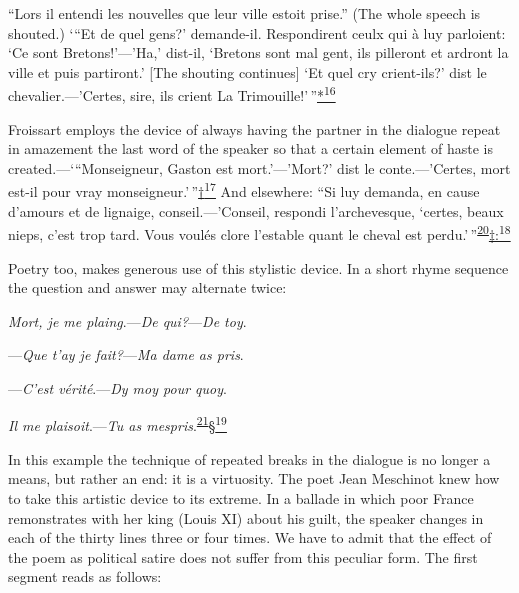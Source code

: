 ``Lors il entendi les nouvelles que leur ville estoit prise.'' (The
whole speech is shouted.) `{}``Et de quel gens?' demande-il.
Respondirent ceulx qui à luy parloient: `Ce sont Bretons!'---'Ha,'
\protect\hypertarget{21_Chapter_Thirteen__IMAGE_AND_WORD.xhtmlux5cux23page_348}{}{}dist-il,
`Bretons sont mal gent, ils pilleront et ardront la ville et puis
partiront.' {[}The shouting continues{]} `Et quel cry crient-ils?' dist
le chevalier.---'Certes, sire, ils crient La
Trimouille!'\,''\protect\hypertarget{21_Chapter_Thirteen__IMAGE_AND_WORD.xhtmlux5cux23id_2725}{\protect\hyperlink{23_NOTES.xhtmlux5cux23id_2726}{*\textsuperscript{16}}}

Froissart employs the device of always having the partner in the
dialogue repeat in amazement the last word of the speaker so that a
certain element of haste is created.---`{}``Monseigneur, Gaston est
mort.'---'Mort?' dist le conte.---'Certes, mort est-il pour vray
monseigneur.'\,''\protect\hypertarget{21_Chapter_Thirteen__IMAGE_AND_WORD.xhtmlux5cux23id_2727}{\protect\hyperlink{23_NOTES.xhtmlux5cux23id_2728}{†\textsuperscript{17}}}
And elsewhere: ``Si luy demanda, en cause d'amours et de lignaige,
conseil.---'Conseil, respondi l'archevesque, `certes, beaux nieps, c'est
trop tard. Vous voulés clore l'estable quant le cheval est
perdu.'\,''\textsuperscript{\protect\hypertarget{21_Chapter_Thirteen__IMAGE_AND_WORD.xhtmlux5cux23id_270}{\protect\hyperlink{23_NOTES.xhtmlux5cux23id_271}{20}}}\protect\hypertarget{21_Chapter_Thirteen__IMAGE_AND_WORD.xhtmlux5cux23id_2729}{\protect\hyperlink{23_NOTES.xhtmlux5cux23id_2730}{‡:\textsuperscript{18}}}

Poetry too, makes generous use of this stylistic device. In a short
rhyme sequence the question and answer may alternate twice:

\emph{Mort, je me plaing}.---\emph{De qui?}---\emph{De toy}.

---\emph{Que t'ay je fait?}---\emph{Ma dame as pris}.

---\emph{C'est vérité}.---\emph{Dy moy pour quoy}.

\emph{Il me plaisoit}.---\emph{Tu as
mespris}.\textsuperscript{\protect\hypertarget{21_Chapter_Thirteen__IMAGE_AND_WORD.xhtmlux5cux23id_268}{\protect\hyperlink{23_NOTES.xhtmlux5cux23id_269}{21}}}\protect\hypertarget{21_Chapter_Thirteen__IMAGE_AND_WORD.xhtmlux5cux23id_2731}{\protect\hyperlink{23_NOTES.xhtmlux5cux23id_2732}{§\textsuperscript{19}}}

In this example the technique of repeated breaks in the dialogue is no
longer a means, but rather an end: it is a virtuosity. The poet Jean
Meschinot knew how to take this artistic device to its extreme. In a
ballade in which poor France remonstrates with her king (Louis XI) about
his guilt, the speaker changes in each of the thirty lines three or four
times. We have to admit that the effect of the poem as political satire
does not suffer from this peculiar form. The first segment reads as
follows:

